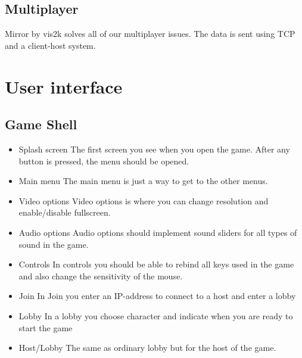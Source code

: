 \documentclass[11pt]{article}
\begin{document}
\subsection{Multiplayer}
Mirror by vis2k solves all of our multiplayer issues. The data is sent using TCP and a client-host system.

\section{User interface}
\subsection{Game Shell}
\begin{itemize}
	\item Splash screen
	\newline The first screen you see when you open the game. After any button is pressed, the menu should be opened.
	\item Main menu
	\newline The main menu is just a way to get to the other menus.
	\item Video options
	\newline Video options is where you can change resolution and enable/disable fullscreen.
	\item Audio options
	\newline Audio options should implement sound sliders for all types of sound in the game.
	\item Controls
	\newline In controls you should be able to rebind all keys used in the game and also change the sensitivity of the mouse.
	\item Join
	\newline In Join you enter an IP-address to connect to a host and enter a lobby
	\item Lobby
	\newline In a lobby you choose character and indicate when you are ready to start the game
	\item Host/Lobby
	\newline The same as ordinary lobby but for the host of the game.
\end{itemize}
\end{document}
